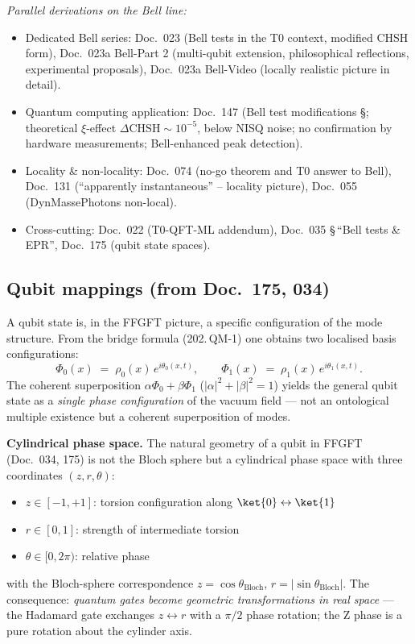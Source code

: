\textit{Parallel derivations on the Bell line:}
\begin{itemize}\setlength\itemsep{0pt}
  \item Dedicated Bell series:
        Doc.~023 (Bell tests in the T0 context, modified CHSH form),
        Doc.~023a Bell-Part 2 (multi-qubit extension, philosophical
        reflections, experimental proposals),
        Doc.~023a Bell-Video (locally realistic picture in detail).
  \item Quantum computing application:
        Doc.~147 (Bell test modifications \S; theoretical
        $\xi$-effect $\Delta\mathrm{CHSH} \sim 10^{-5}$, below
        NISQ noise; no confirmation by hardware measurements;
        Bell-enhanced peak detection).
  \item Locality \& non-locality:
        Doc.~074 (no-go theorem and T0 answer to Bell),
        Doc.~131 (\enquote{apparently instantaneous} -- locality picture),
        Doc.~055 (DynMassePhotons non-local).
  \item Cross-cutting:
        Doc.~022 (T0-QFT-ML addendum),
        Doc.~035 \S\,\enquote{Bell tests \& EPR},
        Doc.~175 (qubit state spaces).
\end{itemize}

\subsection*{Qubit mappings (from Doc.~175, 034)}

A qubit state is, in the FFGFT picture, a specific configuration of
the mode structure. From the bridge formula (202.\,QM-1) one obtains
two localised basis configurations:
\begin{equation}
  \Phi_0(x) \;=\; \rho_0(x)\,e^{i\theta_0(x,t)},
  \qquad
  \Phi_1(x) \;=\; \rho_1(x)\,e^{i\theta_1(x,t)}.
  \tag{202.\,QM-7}
\end{equation}
The coherent superposition
$\alpha\Phi_0 + \beta\Phi_1$ ($|\alpha|^2 + |\beta|^2 = 1$) yields the
general qubit state as a \emph{single phase configuration} of the
vacuum field --- not an ontological multiple existence but a coherent
superposition of modes.

\textbf{Cylindrical phase space.} The natural geometry of a qubit in
FFGFT (Doc.~034, 175) is not the Bloch sphere but a cylindrical
phase space with three coordinates $(z, r, \theta)$:
\begin{itemize}\setlength\itemsep{0pt}
  \item $z \in [-1, +1]$: torsion configuration along
        $\ket{0} \leftrightarrow \ket{1}$
  \item $r \in [0, 1]$: strength of intermediate torsion
  \item $\theta \in [0, 2\pi)$: relative phase
\end{itemize}
with the Bloch-sphere correspondence $z = \cos\theta_{\text{Bloch}}$,
$r = |\sin\theta_{\text{Bloch}}|$. The consequence: \emph{quantum
gates become geometric transformations in real space} --- the Hadamard
gate exchanges $z \leftrightarrow r$ with a $\pi/2$ phase rotation;
the Z phase is a pure rotation about the cylinder axis.

